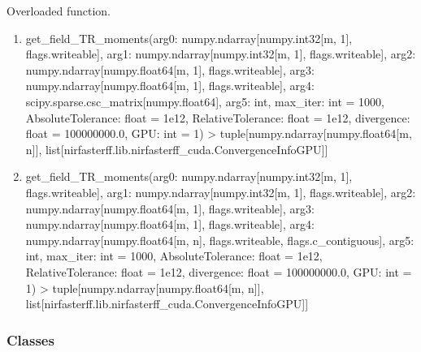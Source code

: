 \documentclass[letterpaper,10pt,english]{sphinxmanual}
\begin{document}
\begin{fulllineitems}
\label{\detokenize{_autosummary/nirfasterff.lib.nirfasterff_cuda.get_field_TR_moments:nirfasterff.lib.nirfasterff_cuda.get_field_TR_moments}}
\pysigstartsignatures
\pysiglinewithargsret
{}
{\sphinxparamcomma {}}
{}
\pysigstopsignatures
\sphinxAtStartPar
Overloaded function.
\begin{enumerate}
%
\item {} 
\sphinxAtStartPar
get\_field\_TR\_moments(arg0: numpy.ndarray{[}numpy.int32{[}m, 1{]}, flags.writeable{]}, arg1: numpy.ndarray{[}numpy.int32{[}m, 1{]}, flags.writeable{]}, arg2: numpy.ndarray{[}numpy.float64{[}m, 1{]}, flags.writeable{]}, arg3: numpy.ndarray{[}numpy.float64{[}m, 1{]}, flags.writeable{]}, arg4: scipy.sparse.csc\_matrix{[}numpy.float64{]}, arg5: int, max\_iter: int = 1000, AbsoluteTolerance: float = 1e\sphinxhyphen{}12, RelativeTolerance: float = 1e\sphinxhyphen{}12, divergence: float = 100000000.0, GPU: int = \sphinxhyphen{}1) \sphinxhyphen{}\textgreater{} tuple{[}numpy.ndarray{[}numpy.float64{[}m, n{]}{]}, list{[}nirfasterff.lib.nirfasterff\_cuda.ConvergenceInfoGPU{]}{]}

\item {} 
\sphinxAtStartPar
get\_field\_TR\_moments(arg0: numpy.ndarray{[}numpy.int32{[}m, 1{]}, flags.writeable{]}, arg1: numpy.ndarray{[}numpy.int32{[}m, 1{]}, flags.writeable{]}, arg2: numpy.ndarray{[}numpy.float64{[}m, 1{]}, flags.writeable{]}, arg3: numpy.ndarray{[}numpy.float64{[}m, 1{]}, flags.writeable{]}, arg4: numpy.ndarray{[}numpy.float64{[}m, n{]}, flags.writeable, flags.c\_contiguous{]}, arg5: int, max\_iter: int = 1000, AbsoluteTolerance: float = 1e\sphinxhyphen{}12, RelativeTolerance: float = 1e\sphinxhyphen{}12, divergence: float = 100000000.0, GPU: int = \sphinxhyphen{}1) \sphinxhyphen{}\textgreater{} tuple{[}numpy.ndarray{[}numpy.float64{[}m, n{]}{]}, list{[}nirfasterff.lib.nirfasterff\_cuda.ConvergenceInfoGPU{]}{]}

\end{enumerate}

\end{fulllineitems}

\subsubsection*{Classes}
\end{document}
